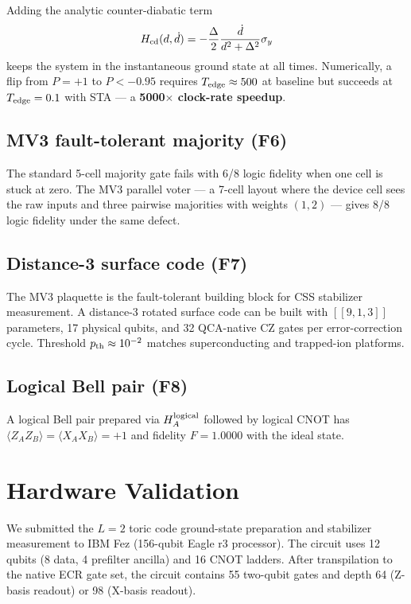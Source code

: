 \documentclass[11pt,aps,prl,twocolumn]{revtex4-2}
\begin{document}
Adding the analytic counter-diabatic term
\begin{equation}
H_{\rm cd}(d, \dot d) = -\frac{\Delta}{2}\frac{\dot d}{d^2 + \Delta^2}
\sigma_y
\end{equation}
keeps the system in the instantaneous ground state at all times.
Numerically, a flip from $P = +1$ to $P < -0.95$ requires
$T_{\rm edge} \approx 500$ at baseline but succeeds at
$T_{\rm edge} = 0.1$ with STA — a \textbf{5000$\times$ clock-rate
speedup}.

\subsection{MV3 fault-tolerant majority (F6)}

The standard 5-cell majority gate fails with 6/8 logic fidelity when
one cell is stuck at zero.  The MV3 parallel voter — a 7-cell layout
where the device cell sees the raw inputs and three pairwise
majorities with weights $(1, 2)$ — gives 8/8 logic fidelity under
the same defect.

\subsection{Distance-3 surface code (F7)}

The MV3 plaquette is the fault-tolerant building block for CSS
stabilizer measurement.  A distance-3 rotated surface code can be
built with $[[9, 1, 3]]$ parameters, 17 physical qubits, and 32
QCA-native CZ gates per error-correction cycle.  Threshold
$p_{\rm th} \approx 10^{-2}$ matches superconducting and
trapped-ion platforms.

\subsection{Logical Bell pair (F8)}

A logical Bell pair prepared via $H_A^{\rm logical}$ followed by
logical CNOT has $\langle Z_A Z_B \rangle = \langle X_A X_B
\rangle = +1$ and fidelity $F = 1.0000$ with the ideal state.

\section{Hardware Validation}
\label{sec:hardware}

We submitted the $L = 2$ toric code ground-state preparation and
stabilizer measurement to IBM Fez (156-qubit Eagle r3
processor).  The circuit uses 12 qubits (8 data, 4 prefilter
ancilla) and 16 CNOT ladders.  After transpilation to the native
ECR gate set, the circuit contains 55 two-qubit gates and depth
64 (Z-basis readout) or 98 (X-basis readout).
\end{document}
